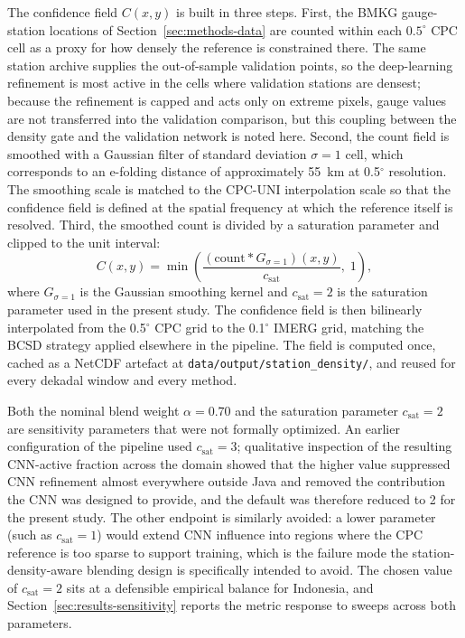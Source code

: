 The confidence field $C(x, y)$ is built in three steps. First,
the BMKG gauge-station locations of
Section~\ref{sec:methods-data} are counted within each
$0.5^{\circ}$ CPC cell as a proxy for how densely the reference
is constrained there. The same station archive supplies the
out-of-sample validation points, so the deep-learning
refinement is most active in the cells where validation stations
are densest; because the refinement is capped and acts only on
extreme pixels, gauge values are not transferred into the
validation comparison, but this coupling between the density
gate and the validation network is noted here.
Second, the count field is smoothed with
a Gaussian filter of standard deviation $\sigma = 1$ cell, which
corresponds to an e-folding distance of approximately 55~km at
0.5$^{\circ}$ resolution. The smoothing scale is matched to the
CPC-UNI interpolation scale so that the confidence field is
defined at the spatial frequency at which the reference itself
is resolved. Third, the smoothed count is divided by a
saturation parameter and clipped to the unit interval:
\begin{equation}
C(x, y) = \min\!\left(
\frac{(\text{count} \ast G_{\sigma=1})(x, y)}{c_{\text{sat}}},
\; 1
\right),
\label{eq:confidence}
\end{equation}
where $G_{\sigma=1}$ is the Gaussian smoothing kernel and
$c_{\text{sat}} = 2$ is the saturation parameter used in the
present study. The confidence field is then bilinearly
interpolated from the 0.5$^{\circ}$ CPC grid to the
0.1$^{\circ}$ IMERG grid, matching the BCSD strategy applied
elsewhere in the pipeline. The field is computed once, cached as
a NetCDF artefact at \texttt{data/output/station\_density/}, and
reused for every dekadal window and every method.

Both the nominal blend weight $\alpha = 0.70$ and the saturation
parameter $c_{\text{sat}} = 2$ are sensitivity parameters that
were not formally optimized. An earlier configuration of the
pipeline used $c_{\text{sat}} = 3$; qualitative inspection of
the resulting CNN-active fraction across the domain showed that
the higher value suppressed CNN refinement almost everywhere
outside Java and removed the contribution the CNN was designed
to provide, and the default was therefore reduced to 2 for the
present study. The other endpoint is similarly avoided: a lower
parameter (such as $c_{\text{sat}} = 1$) would extend CNN
influence into regions where the CPC reference is too sparse to
support training, which is the failure mode the
station-density-aware blending design is specifically intended
to avoid. The chosen value of $c_{\text{sat}} = 2$ sits at a
defensible empirical balance for Indonesia, and
Section~\ref{sec:results-sensitivity} reports the metric
response to sweeps across both parameters.


